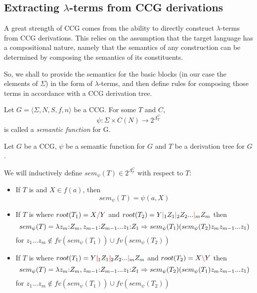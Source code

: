 \documentclass[main.tex]{subfiles}
\begin{document}
\subsection{Extracting $\lambda$-terms from CCG derivations}

A great strength of CCG comes from the ability to directly construct $\lambda$-terms
from CCG derivations. This relies on the assumption that the target
language has a compositional nature, namely that the semantics of any construction
can be determined by composing the semantics of its constituents.

So, we shall to provide the semantics for the basic blocks (in our case
the elements of $\Sigma$) in the form of $\lambda$-terms, and then define rules
for composing those terms in accordance with a CCG derivation tree.

\begin{defn}
    Let $ G = \langle \Sigma, N, S, f, n \rangle $ be a CCG.
    For some $T$ and $C$,
    \[ \psi : \Sigma \times C(N) \rightarrow 2^{\Lambda_T^C} \] is called a
    \emph{semantic function} for G.
\end{defn}

\begin{defn}
    Let $G$ be a CCG, $\psi$ be a semantic function for $G$ and $T$ be a
    derivation tree for $G$.

    We will inductively define $sem_{\psi}(T) \in 2^{\Lambda_T^C}$ with
    respect to $T$:
    \begin{itemize}
        \item If $T$ is
            and $X \in f(a)$, then
            \[ sem_{\psi}(T) = \psi(a, X) \]
        \item If $T$ is
            where $root(T_1) = X \textcolor{red}{/} Y$ and $root(T_2) = Y \textcolor{red}{|}_1 Z_1 \textcolor{red}{|}_2 Z_2 ... \textcolor{red}{|}_m Z_m$ then
            \[ sem_{\psi}(T) = \lambda z_m {:} Z_m, z_{m - 1} {:} Z_{m - 1} ... z_1 {:} Z_1 \Rightarrow
                sem_{\psi}(T_1) ( sem_{\psi}(T_2) z_m z_{m - 1} ... z_1 ) \]
            for $z_1 ... z_m \not\in fv(sem_{\psi}(T_1)) \cup fv(sem_{\psi}(T_2))$
        \item If $T$ is
            where $root(T_1) = Y \textcolor{red}{|}_1 Z_1 \textcolor{red}{|}_2 Z_2 ... \textcolor{red}{|}_m Z_m$ and $root(T_2) = X \textcolor{red}{\backslash} Y$ then
            \[ sem_{\psi}(T) = \lambda z_m {:} Z_m, z_{m - 1} {:} Z_{m - 1} ... z_1 {:} Z_1 \Rightarrow
                sem_{\psi}(T_2) ( sem_{\psi}(T_1) z_m z_{m - 1} ... z_1 ) \]
            for $z_1 ... z_m \not\in fv(sem_{\psi}(T_1)) \cup fv(sem_{\psi}(T_2))$
    \end{itemize}
\end{defn}
\end{document}
